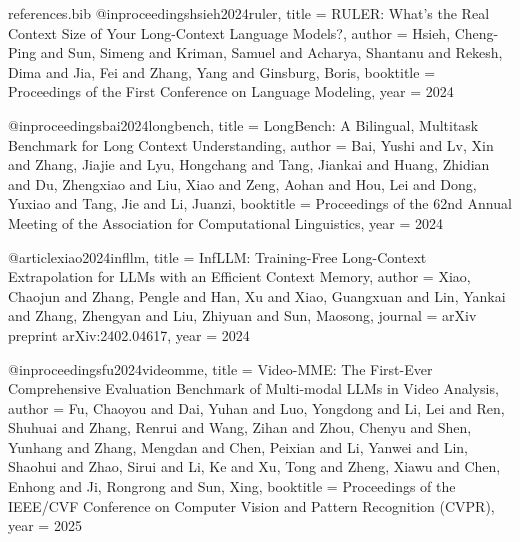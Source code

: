 \begin{filecontents}[overwrite]{references.bib}
@inproceedings{hsieh2024ruler,
  title     = {{RULER}: What's the Real Context Size of Your Long-Context Language Models?},
  author    = {Hsieh, Cheng-Ping and Sun, Simeng and Kriman, Samuel and Acharya, Shantanu and
               Rekesh, Dima and Jia, Fei and Zhang, Yang and Ginsburg, Boris},
  booktitle = {Proceedings of the First Conference on Language Modeling},
  year      = {2024}
}

@inproceedings{bai2024longbench,
  title     = {{LongBench}: A Bilingual, Multitask Benchmark for Long Context Understanding},
  author    = {Bai, Yushi and Lv, Xin and Zhang, Jiajie and Lyu, Hongchang and Tang, Jiankai and
               Huang, Zhidian and Du, Zhengxiao and Liu, Xiao and Zeng, Aohan and Hou, Lei and
               Dong, Yuxiao and Tang, Jie and Li, Juanzi},
  booktitle = {Proceedings of the 62nd Annual Meeting of the Association for Computational Linguistics},
  year      = {2024}
}


@article{xiao2024infllm,
  title   = {{InfLLM}: Training-Free Long-Context Extrapolation for {LLMs} with an Efficient Context Memory},
  author  = {Xiao, Chaojun and Zhang, Pengle and Han, Xu and Xiao, Guangxuan and
             Lin, Yankai and Zhang, Zhengyan and Liu, Zhiyuan and Sun, Maosong},
  journal = {arXiv preprint arXiv:2402.04617},
  year    = {2024}
}


@inproceedings{fu2024videomme,
  title     = {Video-{MME}: The First-Ever Comprehensive Evaluation Benchmark of Multi-modal {LLMs} in Video Analysis},
  author    = {Fu, Chaoyou and Dai, Yuhan and Luo, Yongdong and Li, Lei and Ren, Shuhuai and
               Zhang, Renrui and Wang, Zihan and Zhou, Chenyu and Shen, Yunhang and Zhang, Mengdan and
               Chen, Peixian and Li, Yanwei and Lin, Shaohui and Zhao, Sirui and Li, Ke and Xu, Tong and
               Zheng, Xiawu and Chen, Enhong and Ji, Rongrong and Sun, Xing},
  booktitle = {Proceedings of the IEEE/CVF Conference on Computer Vision and Pattern Recognition (CVPR)},
  year      = {2025}
}
\end{filecontents}

\documentclass[11pt]{article}
\usepackage[margin=1in]{geometry}
\usepackage[numbers]{natbib}
\usepackage{amsmath}
\usepackage{graphicx}
\graphicspath{{assets/}{./}}
\usepackage{subcaption}
\usepackage{hyperref}
\usepackage{booktabs}
\usepackage{tikz}
\usetikzlibrary{arrows.meta}
\usepackage{pgfplots}
\pgfplotsset{compat=1.18}

